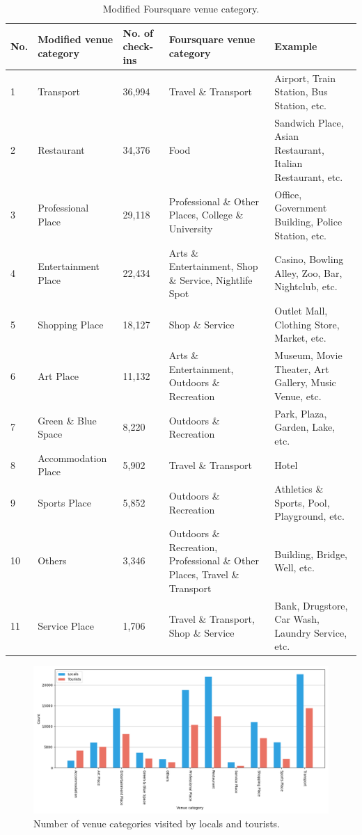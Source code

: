 \documentclass{article}
\theoremstyle{definition}
\theoremstyle{remark}
\begin{document}
\begin{table}[h!]
\centering
\caption{\label{tab:modified_category}Modified Foursquare venue category.}
\begin{adjustbox}{max width=\textwidth, margin=0cm}
\begin{tabular}{lllp{6cm}p{5cm}} \hline
No. & Modified venue category & No. of check-ins & Foursquare venue category 
& Example \\ \hline
1 & Transport & 36,994 & Travel \& Transport & Airport, Train Station, Bus Station, etc. \\
2 & Restaurant & 34,376 & Food & Sandwich Place, Asian Restaurant, Italian Restaurant, etc. \\
3 & Professional Place & 29,118 & Professional \& Other Places, College \& University & Office, Government Building, Police Station, etc. \\
4 & Entertainment Place & 22,434 & Arts \& Entertainment, Shop \& Service, Nightlife Spot & Casino, Bowling Alley, Zoo, Bar, Nightclub, etc. \\
5 & Shopping Place & 18,127 & Shop \& Service & Outlet Mall, Clothing Store, Market, etc. \\
6 & Art Place & 11,132 & Arts \& Entertainment, Outdoors \& Recreation & Museum, Movie Theater, Art Gallery, Music Venue, etc. \\
7 & Green \& Blue Space & 8,220 & Outdoors \& Recreation & Park, Plaza, Garden, Lake, etc. \\
8 & Accommodation Place & 5,902 & Travel \& Transport & Hotel \\
9 & Sports Place & 5,852 & Outdoors \& Recreation & Athletics \& Sports, Pool, Playground, etc. \\
10 & Others & 3,346 & Outdoors \& Recreation, Professional \& Other Places, Travel \& Transport & Building, Bridge, Well, etc. \\
11 & Service Place & 1,706 & Travel \& Transport, Shop \& Service & Bank, Drugstore, Car Wash, Laundry Service, etc. \\ \hline
\end{tabular}
\end{adjustbox}
\end{table}


\begin{figure}[h!]
\centering
\includegraphics[width=1\textwidth]{figures/foursquare_category.png}
\caption{\label{fig:foursquare_category}Number of venue categories visited by locals and tourists.}
\end{figure}
\end{document}
